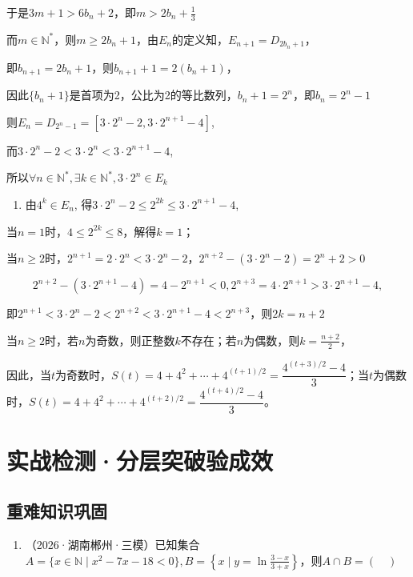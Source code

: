 \documentclass[11pt,a4paper]{ctexart}
\begin{document}
于是\(3m + 1 > 6b_{n} + 2\)，即\(m > 2b_{n} + \frac{1}{3}\)

而\(m \in \mathbb{N}^{*}\)，则\(m \geq 2b_{n} + 1\)，由\(E_{n}\)的定义知，\(E_{n+1}=D_{2b_n+1}\)，

即\(b_{n+1}=2b_{n}+1\)，则\(b_{n+1}+1=2(b_{n}+1)\)，

因此\(\{b_n + 1\}\)是首项为2，公比为2的等比数列，\(b_n + 1 = 2^n\)，即\(b_n = 2^n - 1\)

则\(E_{n}=D_{2^{n}-1}=[3\cdot2^{n}-2,3\cdot2^{n+1}-4]\),

而\(3 \cdot 2^{n} - 2 < 3 \cdot 2^{n} < 3 \cdot 2^{n+1} - 4\),

所以\(\forall n\in \mathbb{N}^{*},\exists k\in \mathbb{N}^{*},3\cdot 2^{n}\in E_{k}\)

\begin{enumerate}[label=\arabic*., leftmargin=*, start=3]
\item 由\(4^{k} \in E_{n}\),
  得\(3 \cdot 2^{n} - 2 \leq 2^{2k} \leq 3 \cdot 2^{n+1} - 4\),
\end{enumerate}

当\(n = 1\)时，\(4 \leq 2^{2k} \leq 8\)，解得\(k = 1\)；

当\(n \geq 2\)时，\(2^{n+1} = 2 \cdot 2^n < 3 \cdot 2^n - 2\)，\(2^{n+2} - (3 \cdot 2^n - 2) = 2^n + 2 > 0\)

\[
2 ^ {n + 2} - (3 \cdot 2 ^ {n + 1} - 4) = 4 - 2 ^ {n + 1} <   0, 2 ^ {n + 3} = 4 \cdot 2 ^ {n + 1} > 3 \cdot 2 ^ {n + 1} - 4,
\]

即\(2^{n+1} < 3 \cdot 2^n - 2 < 2^{n+2} < 3 \cdot 2^{n+1} - 4 < 2^{n+3}\)，则\(2k = n + 2\)

当\(n \geq 2\)时，若\(n\)为奇数，则正整数\(k\)不存在；若\(n\)为偶数，则\(k = \frac{n + 2}{2}\)，

因此，当\(t\)为奇数时，\(S(t)=4+4^2+\cdots+4^{(t+1)/2}=\dfrac{4^{(t+3)/2}-4}{3}\)；当\(t\)为偶数时，\(S(t)=4+4^2+\cdots+4^{(t+2)/2}=\dfrac{4^{(t+4)/2}-4}{3}\)。

\section{实战检测·分层突破验成效}\label{ux5b9eux6218ux68c0ux6d4bux5206ux5c42ux7a81ux7834ux9a8cux6210ux6548}

\subsection{重难知识巩固}\label{ux91cdux96beux77e5ux8bc6ux5de9ux56fa}

\begin{enumerate}[label=\arabic*., leftmargin=*]
\item （2026·湖南郴州·三模）已知集合\(A=\{x\in \mathbb{N}\mid x^{2}-7x-18<0\},B=\left\{x\mid y=\ln\frac{3-x}{3+x}\right\}\)，则\(A\cap B=(\quad)\)
\end{enumerate}
\end{document}
